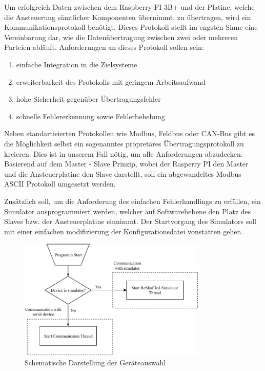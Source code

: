 Um erfolgreich Daten zwischen dem Raspberry PI 3B+ und der Platine, welche die Ansteuerung sämtlicher Komponenten übernimmt, zu übertragen, wird ein Kommunikationsprotokoll benötigt.
Dieses Protokoll stellt im engsten Sinne eine Vereinbarung dar, wie die Datenübertragung zwischen zwei oder mehreren Parteien abläuft. Anforderungen an dieses Protokoll sollen sein:
\begin{enumerate}
    \item einfache Integration in die Zielsysteme
    \item erweiterbarkeit des Protokolls mit geringem Arbeitsaufwand
    \item hohe Sicherheit gegenüber Übertragungsfehler
    \item schnelle Fehlererkennung sowie Fehlerbehebung
\end{enumerate}
Neben standartisierten Protokollen wie Modbus, Feldbus oder CAN-Bus gibt es die Möglichkeit selbst ein sogenanntes propretäres Übertragungsprotokoll zu kreieren. Dies ist in unserem Fall nötig, um alle Anforderungen abzudecken.
Basierend auf dem Master - Slave Prinzip, wobei der Rasperry PI den Master und die Ansteuerplatine den Slave darstellt, soll ein abgewandeltes Modbus ASCII Protokoll umgesetzt werden.

Zusätzlich soll, um die Anforderung des einfachen Fehlerhandlings zu erfüllen, ein Simulator ausprogrammiert werden, welcher auf Softwarebebene den Platz des Slaves bzw. der Ansteuerplatine einnimmt.
Der Startvorgang des Simulators soll mit einer einfachen modifizierung der Konfigurationsdatei vonstatten gehen.

\begin{figure}[H]
    \centering
    \includegraphics[width=0.8\textwidth]{fig/ainf/DeviceSelection}
    \caption{Schematische Darstellung der Geräteauswahl}
\end{figure}
